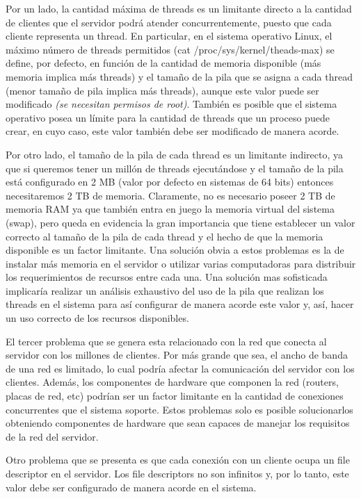 Por un lado, la cantidad máxima de threads es un limitante directo a la cantidad de clientes que el servidor podrá atender concurrentemente, puesto que cada cliente representa un thread. En particular, en el sistema operativo Linux, el máximo número de threads permitidos (cat /proc/sys/kernel/theads-max) se define, por defecto, en función de la cantidad de memoria disponible (más memoria implica más threads) y el tamaño de la pila que se asigna a cada thread (menor tamaño de pila implica más threads), aunque este valor puede ser modificado \textit{(se necesitan permisos de root)}.
También es posible que el sistema operativo posea un límite para la cantidad de threads que un proceso puede crear, en cuyo caso, este valor también debe ser modificado de manera acorde.

Por otro lado, el tamaño de la pila de cada thread es un limitante indirecto, ya que si queremos tener un millón de threads ejecutándose y el tamaño de la pila está configurado en 2 MB (valor por defecto en sistemas de 64 bits) entonces necesitaremos 2 TB de memoria. Claramente, no es necesario poseer 2 TB de memoria RAM ya que también entra en juego la memoria virtual del sistema (swap), pero queda en evidencia la gran importancia que tiene establecer un valor correcto al tamaño de la pila de cada thread y el hecho de que la memoria disponible es un factor limitante.
Una solución obvia a estos problemas es la de instalar más memoria en el servidor o utilizar varias computadoras para distribuir los requerimientos de recursos entre cada una. Una solución mas sofisticada implicaría realizar un análisis exhaustivo del uso de la pila que realizan los threads en el sistema para así configurar de manera acorde este valor y, así, hacer un uso correcto de los recursos disponibles.

El tercer problema que se genera esta relacionado con la red que conecta al servidor con los millones de clientes. Por más grande que sea, el ancho de banda de una red es limitado, lo cual podría afectar la comunicación del servidor con los clientes. Además, los componentes de hardware que componen la red (routers, placas de red, etc) podrían ser un factor limitante en la cantidad de conexiones concurrentes que el sistema soporte. Estos problemas solo es posible solucionarlos obteniendo componentes de hardware que sean capaces de manejar los requisitos de la red del servidor.

Otro problema que se presenta es que cada conexión con un cliente ocupa un file descriptor en el servidor. Los file descriptors no son infinitos y, por lo tanto, este valor debe ser configurado de manera acorde en el sistema.

